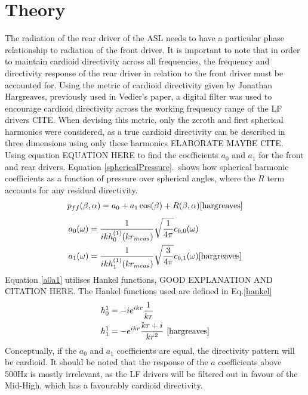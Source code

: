 \documentclass{report}
\begin{document}
        \section{Theory}
            The radiation of the rear driver of the ASL needs to have a particular phase relationship to radiation of the front driver.
            It is important to note that in order to maintain cardioid directivity across all frequencies, the frequency and directivity response of the rear driver in relation to the front driver must be accounted for.
            Using the metric of cardioid directivity given by Jonathan Hargreaves, previously used in Vedier's paper, a digital filter was used to encourage cardioid directivity across the working frequency range of the LF drivers CITE.
            When devising this metric, only the zeroth and first spherical harmonics were considered, as a true cardioid directivity can be described in three dimensions using only these harmonics ELABORATE MAYBE CITE.
            Using equation EQUATION HERE to find the coefficients $a_0$ and $a_1$ for the front and rear drivers.
            Equation \ref{sphericalPressure}.\ shows how spherical harmonic coefficients as a function of pressure over spherical angles, where the $R$ term accounts for any residual directivity.
            \begin{equation}
                p_{ff}(\beta,\alpha) = a_0 + a_1 \cos(\beta) + R(\beta,\alpha)
                \label{sphericalPressure}
                \cite{hargreaves}
            \end{equation}
            \begin{equation}
                \begin{split}
                    a_0(\omega) &= \frac{1}{ikh_0^{(1)}(kr_{meas})} \sqrt{\frac{1}{4\pi}} c_{0,0}(\omega) \\
                    a_1(\omega) &= \frac{1}{ikh_1^{(1)}(kr_{meas})} \sqrt{\frac{3}{4\pi}} c_{0,1}(\omega)
                    \label{a0a1}
                    \cite{hargreaves}
                \end{split}
            \end{equation}
            Equation \ref{a0a1} utilises Hankel functions, GOOD EXPLANATION AND CITATION HERE.
            The Hankel functions used are defined in Eq.\ref{hankel}
            \begin{equation}
                \begin{split}
                    h_0^1 &= -i  e^{ikr}  \frac{1}{kr} \\
                    h_1^1 &= -e^{ikr}  \frac{kr + i}{kr^2} ~\cite{hargreaves}
                    \label{hankel}
                \end{split}
            \end{equation}
            Conceptually, if the $a_0$ and $a_1$ coefficients are equal, the directivity pattern will be cardioid.
            It should be noted that the response of the $a$ coefficients above 500Hz is mostly irrelevant, as the LF drivers will be filtered out in favour of the Mid-High, which has a favourably cardioid directivity.
\end{document}
